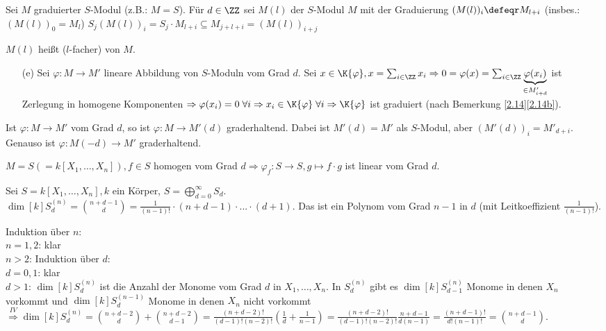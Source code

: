 \begin{nnBsp}
Sei $M$ graduierter $S$-Modul (z.B.: $M=S$). Für $d\in\ZZ$ sei
$M(l)$ der $S$-Modul $M$ mit der Graduierung $(M(l))_i\defeqr M_{l+i}$
(insbes.: $(M(l))_0=M_l$)
$S_j(M(l))_i=S_j\cdot M_{l+i}\subseteq M_{j+l+i}=(M(l))_{i+j}$

$M(l)$ heißt ($l$-facher)  von $M$.
\end{nnBsp}

\begin{Bew}
  \begin{enumerate}
    \item[(e)] Sei $\varphi: M \to M'$ lineare Abbildung von $S$-Moduln vom Grad
    $d$. Sei $x \in \K{\varphi}, x = \sum_{i \in \ZZ} x_i
    \Rightarrow 0 = \varphi(x) = \sum_{i \in \ZZ} \underset{\in M'_{i +
    d}}{\underbrace{\varphi(x_i)}}$ ist Zerlegung in homogene Komponenten
    $\Rightarrow \varphi(x_i) = 0 \; \forall i \Rightarrow x_i \in \K{\varphi} \; \forall i \Rightarrow \K{\varphi}$ ist graduiert
    (nach Bemerkung \ref{2.14}\ref{2.14b}).
  \end{enumerate}
\end{Bew}

\begin{Beo}
  Ist $\varphi: M \to M'$ vom Grad $d$, so ist $\varphi: M \to M'(d)$
  graderhaltend. Dabei ist $M'(d) = M'$ als $S$-Modul, aber $(M'(d))_i = M'_{d
  +i}$. Genauso ist $\varphi: M(-d) \to M'$ graderhaltend.
\end{Beo}

\begin{nnBsp}
  $M = S (=k[X_1, \dots, X_n]), f \in S$ homogen vom Grad $d \Rightarrow
  \varphi_f: S \to S, g \mapsto f \cdot g$ ist linear vom Grad $d$.
\end{nnBsp}

\begin{Prop}
  Sei $S = k[X_1, \dots, X_n], k$ ein Körper, $S = \bigoplus_{d = 0}^{\infty} S_d$.\\
  $\dim[k]{S_d^{(n)}} = \binom{n+d-1}{d} = \frac{1}{(n-1)!} \cdot (n+d-1)
  \cdot ... 
  \cdot (d+1)$. Das ist ein Polynom vom Grad $n-1$ in $d$ (mit Leitkoeffizient
  $\frac{1}{(n-1)!}$).
\end{Prop}

\begin{Bew}
  Induktion über $n$:\\
  $n=1,2$: klar\\
  $n>2$:  Induktion über $d$:\\
  $d=0,1$: klar\\
  $d>1$: $\dim[k]{S_d^{(n)}}$ ist die Anzahl der Monome vom Grad $d$ in $X_1, \dots,
  X_n$. In $S_d^{(n)}$ gibt es $\dim[k]{S_{d-1}^{(n)}}$ Monome in denen $X_n$ vorkommt und $\dim[k]{S_d^{(n-1)}}$ Monome in denen $X_n$ nicht
  vorkommt $\overset{IV}{\Rightarrow}
  \dim[k]{S_d^{(n)}} = \binom{n+d-2}{d} +
  \binom{n+d-2}{d-1} = \frac{(n+d-2)!}{(d-1)! (n-2)!} (\frac{1}{d} + \frac{1}{n-1}) =
  \frac{(n+d-2)!}{(d-1)! (n-2)!} \frac{n+d-1}{d(n-1)} = \frac{(n+d-1)!}{d!
  (n-1)!} = \binom{n+d-1}{d}$.
\end{Bew}

